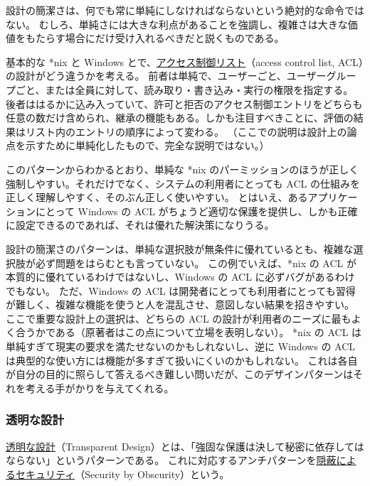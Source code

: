 \documentclass[uplatex]{jsarticle}
\def\label#1{}%
\begin{document}
\begin{rem}[設計の簡潔さは絶対的な命令ではない]\label{rem:ch4-economy-not-absolute}
設計の簡潔さは、何でも常に単純にしなければならないという絶対的な命令ではない。
むしろ、単純さには大きな利点があることを強調し、複雑さは大きな価値をもたらす場合にだけ受け入れるべきだと説くものである。
\end{rem}

\begin{exa}\label{exa:ch4-acl}
基本的な *nix と Windows とで、\underline{アクセス制御リスト}（access control list, ACL）の設計がどう違うかを考える。
前者は単純で、ユーザーごと、ユーザーグループごと、または全員に対して、読み取り・書き込み・実行の権限を指定する。
後者ははるかに込み入っていて、許可と拒否のアクセス制御エントリをどちらも任意の数だけ含められ、継承の機能もある。しかも注目すべきことに、評価の結果はリスト内のエントリの順序によって変わる。
（ここでの説明は設計上の論点を示すために単純化したもので、完全な説明ではない。）

このパターンからわかるとおり、単純な *nix のパーミッションのほうが正しく強制しやすい。それだけでなく、システムの利用者にとっても ACL の仕組みを正しく理解しやすく、そのぶん正しく使いやすい。
とはいえ、あるアプリケーションにとって Windows の ACL がちょうど適切な保護を提供し、しかも正確に設定できるのであれば、それは優れた解決策になりうる。

設計の簡潔さのパターンは、単純な選択肢が無条件に優れているとも、複雑な選択肢が必ず問題をはらむとも言っていない。
この例でいえば、*nix の ACL が本質的に優れているわけではないし、Windows の ACL に必ずバグがあるわけでもない。
ただ、Windows の ACL は開発者にとっても利用者にとっても習得が難しく、複雑な機能を使うと人を混乱させ、意図しない結果を招きやすい。
ここで重要な設計上の選択は、どちらの ACL の設計が利用者のニーズに最もよく合うかである（原著者はこの点について立場を表明しない）。
*nix の ACL は単純すぎて現実の要求を満たせないのかもしれないし、逆に Windows の ACL は典型的な使い方には機能が多すぎて扱いにくいのかもしれない。
これは各自が自分の目的に照らして答えるべき難しい問いだが、このデザインパターンはそれを考える手がかりを与えてくれる。
\end{exa}

\subsubsection{透明な設計}

\begin{dfn}[透明な設計]\label{dfn:ch4-transparent-design}
\underline{透明な設計}（Transparent Design）とは、「強固な保護は決して秘密に依存してはならない」というパターンである。
これに対応するアンチパターンを\underline{隠蔽によるセキュリティ}（Security by Obscurity）という。
\end{dfn}
\end{document}
